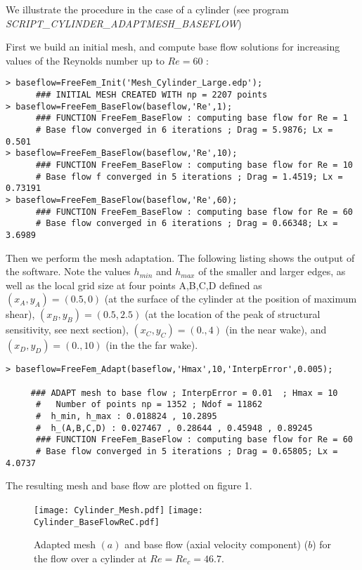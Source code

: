 \documentclass{elsarticle}
\begin{document}
We illustrate the procedure in the case of a cylinder (see program {\em SCRIPT\_CYLINDER\_ADAPTMESH\_BASEFLOW}) 

First we build an initial mesh, and compute base flow solutions for increasing values of the Reynolds number up to $Re = 60$ :

\small
\begin{lstlisting}
> baseflow=FreeFem_Init('Mesh_Cylinder_Large.edp');
      ### INITIAL MESH CREATED WITH np = 2207 points
> baseflow=FreeFem_BaseFlow(baseflow,'Re',1);
      ### FUNCTION FreeFem_BaseFlow : computing base flow for Re = 1
      # Base flow converged in 6 iterations ; Drag = 5.9876; Lx = 0.501
> baseflow=FreeFem_BaseFlow(baseflow,'Re',10);
      ### FUNCTION FreeFem_BaseFlow : computing base flow for Re = 10
      # Base flow f converged in 5 iterations ; Drag = 1.4519; Lx = 0.73191
> baseflow=FreeFem_BaseFlow(baseflow,'Re',60);
      ### FUNCTION FreeFem_BaseFlow : computing base flow for Re = 60
      # Base flow converged in 6 iterations ; Drag = 0.66348; Lx = 3.6989
\end{lstlisting}
\normal

Then we perform the mesh adaptation. The following listing shows the output of the software. Note the values $h_{min}$ and $h_{max}$ of the smaller and larger edges, as well as the local grid size at four points A,B,C,D defined as $(x_A,y_A) = (0.5,0)$ (at the surface of the cylinder at the position of maximum shear), $(x_B,y_B) = (0.5,2.5)$ (at the location of the peak of structural sensitivity, see next section), $(x_C,y_C) = (0.,4)$ (in the near wake), and $(x_D,y_D) = (0.,10)$ (in the the far wake).


\small
\begin{lstlisting}
> baseflow=FreeFem_Adapt(baseflow,'Hmax',10,'InterpError',0.005);

     ### ADAPT mesh to base flow ; InterpError = 0.01  ; Hmax = 10
      #   Number of points np = 1352 ; Ndof = 11862
      #  h_min, h_max : 0.018824 , 10.2895
      #  h_(A,B,C,D) : 0.027467 , 0.28644 , 0.45948 , 0.89245
      ### FUNCTION FreeFem_BaseFlow : computing base flow for Re = 60
      # Base flow converged in 5 iterations ; Drag = 0.65805; Lx = 4.0737
\end{lstlisting}
\normalsize

The resulting mesh and base flow are plotted on figure 1.

\begin{figure}
\texttt{[image: Cylinder\_Mesh.pdf]}
\texttt{[image: Cylinder\_BaseFlowReC.pdf]}
\caption{Adapted mesh $(a)$  and base flow (axial velocity component) ($b$) for the flow over a cylinder at $Re=Re_c = 46.7$.}
\label{fig:Baseflow}
\end{figure}
\end{document}
